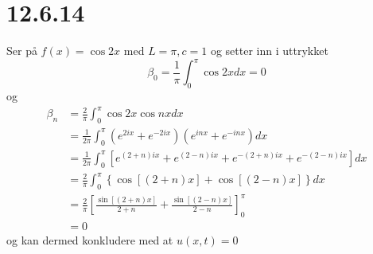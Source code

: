 \documentclass{report}
\newcommand{\nbrack}[1]{\left( #1 \right)}
\newcommand{\bbrack}[1]{\left[ #1 \right]}
\newcommand{\cbrack}[1]{\left\lbrace #1 \right\rbrace}
\begin{document}
\section*{12.6.14}
Ser på $f(x) = \cos 2x$ med $L=\pi, c=1$ og setter inn i uttrykket
\begin{equation}
  \label{eq:18}
  \beta_{0} = \frac{1}{\pi} \int_{0}^{\pi} \cos 2x dx = 0
\end{equation}
og
\begin{equation}
  \label{eq:19}
  \begin{split}
    \beta_{n} &= \frac{2}{\pi} \int_{0}^{\pi} \cos 2x \cos nx dx \\
              &= \frac{1}{2\pi} \int_{0}^{\pi} \nbrack{ e^{2ix} + e^{-2ix} } \nbrack{ e^{inx} + e^{-inx} } dx \\
              &= \frac{1}{2\pi} \int_{0}^{\pi} \bbrack{ e^{(2+n) ix} + e^{(2-n) ix} + e^{-(2+n) ix} + e^{-(2-n) ix} } dx \\
              &= \frac{2}{\pi} \int_{0}^{\pi} \cbrack{ \cos \bbrack{ (2+n) x } + \cos \bbrack{ (2-n) x } } dx \\
              &= \frac{2}{\pi} \bbrack{ \frac{\sin \bbrack{ (2+n) x }}{2+n} + \frac{\sin \bbrack{ (2-n) x }}{2-n} }_{0}^{\pi} \\
              &= 0
  \end{split}
\end{equation}
og kan dermed konkludere med at $u(x, t) = 0$
\end{document}
